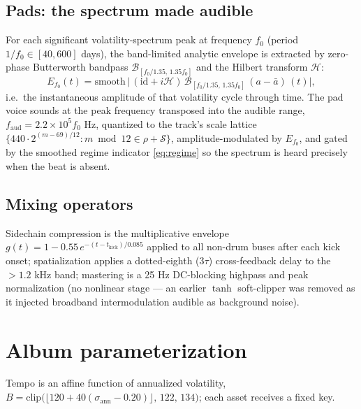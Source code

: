 \documentclass[11pt,a4paper]{article}
\begin{document}
\subsection{Pads: the spectrum made audible}

For each significant volatility-spectrum peak at frequency $f_0$ (period
$1/f_0 \in [40,600]$ days), the band-limited analytic envelope is extracted by
zero-phase Butterworth bandpass $\mathcal B_{[f_0/1.35,\,1.35 f_0]}$ and the
Hilbert transform $\mathcal H$:
\begin{equation}
E_{f_0}(t) = \mathrm{smooth}\,\bigl|\,(\mathrm{id} + i\mathcal H)\,
\mathcal B_{[f_0/1.35,\,1.35f_0]}\,(a - \bar a)\,(t)\bigr| ,
\end{equation}
i.e.\ the instantaneous amplitude of that volatility cycle through time. The pad
voice sounds at the peak frequency transposed into the audible range,
$f_{\mathrm{aud}} = 2.2\times10^{5} f_0$ Hz, quantized to the track's scale
lattice $\{440\cdot2^{(m-69)/12}\colon m \bmod 12 \in \rho + \mathcal S\}$,
amplitude-modulated by $E_{f_0}$, and gated by the smoothed regime indicator
\eqref{eq:regime} so the spectrum is heard precisely when the beat is absent.

\subsection{Mixing operators}

Sidechain compression is the multiplicative envelope
$g(t) = 1 - 0.55\, e^{-(t-t_{\mathrm{kick}})/0.085}$ applied to all non-drum
buses after each kick onset; spatialization applies a dotted-eighth
($3\tau$) cross-feedback delay to the $>\!1.2$ kHz band; mastering is a 25 Hz
DC-blocking highpass and peak normalization (no nonlinear stage --- an earlier
$\tanh$ soft-clipper was removed as it injected broadband intermodulation
audible as background noise).

\section{Album parameterization}

Tempo is an affine function of annualized volatility,
$B = \mathrm{clip}\bigl(\lfloor 120 + 40(\sigma_{\mathrm{ann}} - 0.20)\rfloor,\,
122,\, 134\bigr)$; each asset receives a fixed key.
\end{document}
